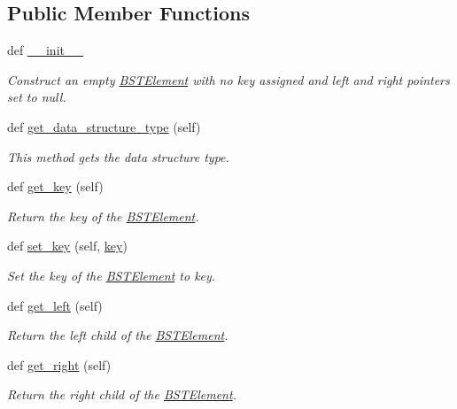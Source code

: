 \subsection*{Public Member Functions}
\begin{DoxyCompactItemize}
\item 
def \hyperlink{class_bridges_1_1bst__element_1_1_b_s_t_element_a01d3329a0d925cb1867b53d93daf56d8}{\+\_\+\+\_\+init\+\_\+\+\_\+}
\begin{DoxyCompactList}\small\item\em Construct an empty \hyperlink{class_bridges_1_1bst__element_1_1_b_s_t_element}{B\+S\+T\+Element} with no key assigned and left and right pointers set to null. \end{DoxyCompactList}\item 
def \hyperlink{class_bridges_1_1bst__element_1_1_b_s_t_element_a2ae53418d5efb075d9e63c675f4cdcdb}{get\+\_\+data\+\_\+structure\+\_\+type} (self)
\begin{DoxyCompactList}\small\item\em This method gets the data structure type. \end{DoxyCompactList}\item 
def \hyperlink{class_bridges_1_1bst__element_1_1_b_s_t_element_ac0ec75f813b838cf0f817ca6e4814766}{get\+\_\+key} (self)
\begin{DoxyCompactList}\small\item\em Return the key of the \hyperlink{class_bridges_1_1bst__element_1_1_b_s_t_element}{B\+S\+T\+Element}. \end{DoxyCompactList}\item 
def \hyperlink{class_bridges_1_1bst__element_1_1_b_s_t_element_ad72900f1e40534cbfe8b88d37e391750}{set\+\_\+key} (self, \hyperlink{class_bridges_1_1bst__element_1_1_b_s_t_element_a834b1b25706d7cba9017fc3b1c637cd7}{key})
\begin{DoxyCompactList}\small\item\em Set the key of the \hyperlink{class_bridges_1_1bst__element_1_1_b_s_t_element}{B\+S\+T\+Element} to key. \end{DoxyCompactList}\item 
def \hyperlink{class_bridges_1_1bst__element_1_1_b_s_t_element_a7f12207f3859f60be107468000cc2375}{get\+\_\+left} (self)
\begin{DoxyCompactList}\small\item\em Return the left child of the \hyperlink{class_bridges_1_1bst__element_1_1_b_s_t_element}{B\+S\+T\+Element}. \end{DoxyCompactList}\item 
def \hyperlink{class_bridges_1_1bst__element_1_1_b_s_t_element_a96c3a91946f244720054c2d480a05955}{get\+\_\+right} (self)
\begin{DoxyCompactList}\small\item\em Return the right child of the \hyperlink{class_bridges_1_1bst__element_1_1_b_s_t_element}{B\+S\+T\+Element}. \end{DoxyCompactList}\end{DoxyCompactItemize}
